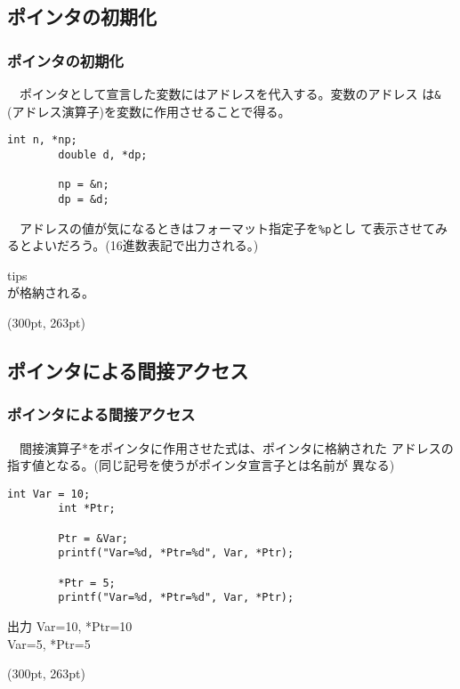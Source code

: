 \documentclass[dvipdfmx]{beamer}
\begin{document}
\subsection{ポインタの初期化}
\begin{frame}[t, fragile, label=67]
    \frametitle{ポインタの初期化}
    　ポインタとして宣言した変数にはアドレスを代入する。変数のアドレス
    は\verb|&|(アドレス演算子)を変数に作用させることで得る。
    \begin{lstlisting}[gobble=8, caption=Example\space of\space Pointer\space Initialization]
        int n, *np;
        double d, *dp;

        np = &n;
        dp = &d;
    \end{lstlisting}
    　アドレスの値が気になるときはフォーマット指定子を\texttt{\%p}とし
    て表示させてみるとよいだろう。(16進数表記で出力される。)
    \begin{itembox}[l]{tips}
        \\
        が格納される。
    \end{itembox}
    \begin{textblock*}{0.3\linewidth}(300pt, 263pt)
        \hyperlink{66}{}
        \space
        \hyperlink{68}{}
    \end{textblock*}
\end{frame}

\subsection{ポインタによる間接アクセス}
\begin{frame}[t, fragile, label=68]
    \frametitle{ポインタによる間接アクセス}
    　間接演算子*をポインタに作用させた式は、ポインタに格納された
    アドレスの指す値となる。(同じ記号を使うがポインタ宣言子とは名前が
    異なる)
    \begin{lstlisting}[gobble=8, caption=Pointer\space Example]
        int Var = 10;
        int *Ptr;

        Ptr = &Var;
        printf("Var=%d, *Ptr=%d", Var, *Ptr);

        *Ptr = 5;
        printf("Var=%d, *Ptr=%d", Var, *Ptr);
    \end{lstlisting}
    \begin{block}{出力}
        Var=10, *Ptr=10\\
        Var=5, *Ptr=5
    \end{block}
    \begin{textblock*}{0.3\linewidth}(300pt, 263pt)
        \hyperlink{67}{}
        \space
        \hyperlink{69}{}
    \end{textblock*}
\end{frame}
\end{document}
